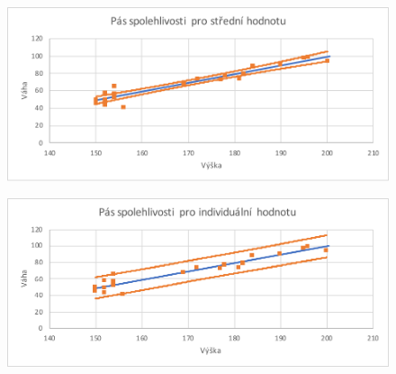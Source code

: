 \documentclass[a4paper, 11pt]{article}
\begin{document}
	\begin{figure}[H]
		\centering
		\includegraphics[width=.7 \linewidth]{img/2-c-3-spol-stred.pdf}
	\end{figure}

	\begin{figure}[H]
		\centering
		\includegraphics[width=.7 \linewidth]{img/2-c-3-spol-indiv.pdf}
	\end{figure}
\end{document}
